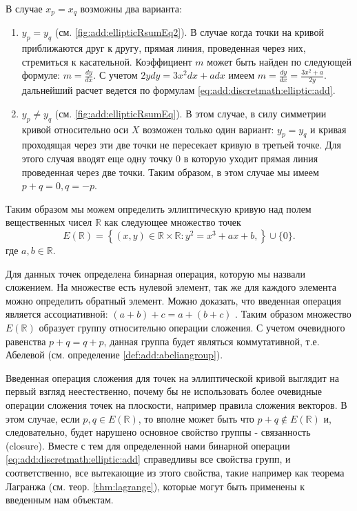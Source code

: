 В случае $x_p = x_q$ возможны два варианта:
\begin{enumerate}
\item $y_p = y_q$ (см. \autoref{fig:add:ellipticRsumEq2}). В случае
  когда точки на кривой приближаются друг к другу, прямая линия,
  проведенная через них, стремиться к касательной. Коэффициент $m$
  может быть найден по следующей формуле: $m = \frac{dy}{dx}$. С
  учетом $2ydy = 3x^2 dx + a dx$ имеем $m = \frac{dy}{dx} = \frac{3
    x^2 + a}{2y}$. дальнейший расчет ведется по формулам
  \eqref{eq:add:discretmath:elliptic:add}. 
\item $y_p \ne y_q$ (см. \autoref{fig:add:ellipticRsumEq}). В этом
  случае, в силу симметрии кривой относительно оси $X$ возможен только
  один вариант: $y_p = y_q$ и кривая проходящая через эти две точки не
  пересекает кривую в третьей точке. Для этого случая вводят еще одну
  точку $0$ в которую уходит прямая линия проведенная через две точки.
  Таким образом, в этом случае мы имеем $p + q = 0, q = -p$.
\end{enumerate}

Таким образом мы можем определить эллиптическую кривую над полем
вещественных чисел $\mathbb{R}$ как следующее множество точек
\begin{equation}
E\left(\mathbb{R}\right) = \left\{ (x,y) \in \mathbb{R} \times \mathbb{R}:
y^2 = x^3 +ax +b, 
\right\} \cup \{0\}.
\label{eq:add:discretmath:elliptic:er}
\end{equation}
где $a,b \in \mathbb{R}$.

Для данных точек определена бинарная операция, которую мы назвали
сложением. На множестве есть нулевой элемент, так же для каждого
элемента можно определить обратный элемент. Можно доказать, что
введенная операция является ассоциативной: $(a+b) + c = a + (b+c)$
\cite{Washington:2008:ECN:1388394}. Таким образом множество
$E\left(\mathbb{R}\right)$ образует группу относительно операции
сложения. С учетом очевидного равенства $p + q = q + p$, данная группа
будет являться коммутативной, т.е. Абелевой (см. определение
\ref{def:add:abeliangroup}).   

\begin{remark}
Введенная операция сложения для точек на эллиптической кривой выглядит
на первый взгляд неестественно, почему бы не использовать более
очевидные операции сложения точек на плоскости, например правила
сложения векторов. В этом случае, если $p,q \in
E\left(\mathbb{R}\right)$, то вполне может быть что $p + q \not\in
E\left(\mathbb{R}\right)$ и, следовательно, будет нарушено основное
свойство группы - связанность (closure). Вместе с тем для определенной
нами бинарной операции \eqref{eq:add:discretmath:elliptic:add}
справедливы все свойства групп, и соответственно, все вытекающие из
этого свойства, такие например как теорема Лагранжа (см. теор.
\ref{thm:lagrange}),  которые могут 
быть применены к введенным нам объектам.
\end{remark}



